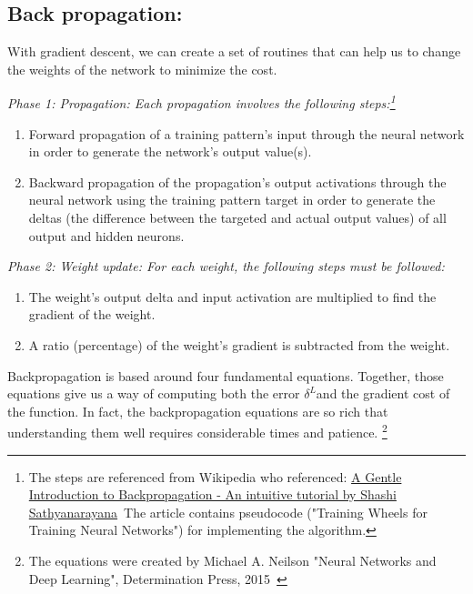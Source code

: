 \documentclass[]{article}
\begin{document}
\begin{multicols}{2}

\section{Back propagation:}

With gradient descent, we can create a set of routines that can help us
to change the weights of the network to minimize the cost.

{\texorpdfstring \emph{Phase 1: Propagation: Each propagation
involves the following steps:\footnote{The steps are referenced from
  Wikipedia who referenced:
  \href{http://numericinsight.com/uploads/A_Gentle_Introduction_to_Backpropagation.pdf}{A
  Gentle Introduction to Backpropagation - An intuitive tutorial by
  Shashi Sathyanarayana}~The article contains pseudocode ("Training
  Wheels for Training Neural Networks") for implementing the algorithm.}}{Phase 1: Propagation: Each propagation involves the following steps:}}\label{phase-1-propagation-each-propagation-involves-the-following-steps}

\begin{enumerate}
\def\labelenumi{\arabic{enumi}.}
\item
  Forward propagation of a training pattern's input through the neural
  network in order to generate the network's output value(s).
\item
  Backward propagation of the propagation's output activations through
  the neural network using the training pattern target in order to
  generate the deltas (the difference between the targeted and actual
  output values) of all output and hidden neurons.
\end{enumerate}

\emph{Phase 2: Weight update: For each weight, the following
steps must be
followed:}\label{phase-2-weight-update-for-each-weight-the-following-steps-must-be-followed}

\begin{enumerate}
\def\labelenumi{\arabic{enumi}.}
\item
  The weight's output delta and input activation are multiplied to find
  the gradient of the weight.
\item
  A ratio (percentage) of the weight's gradient is subtracted from the
  weight.
\end{enumerate}

Backpropagation is based around four fundamental equations. Together,
those equations give us a way of computing both the error
\(\delta^{L}\)and the gradient cost of the function. In fact, the
backpropagation equations are so rich that understanding them well
requires considerable times and patience. \footnote{The equations were
  created by Michael A. Neilson "Neural Networks and Deep Learning",
  Determination Press, 2015~}


\end{multicols}
\end{document}
